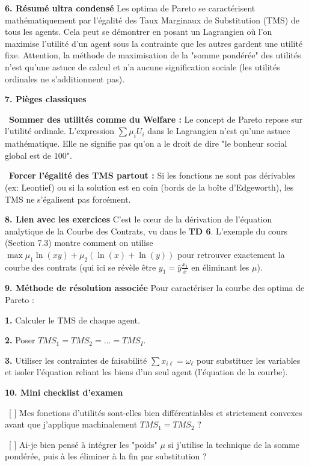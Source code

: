 \documentclass[11pt, a4paper]{report}
\begin{document}
\textbf{6. Résumé ultra condensé}
Les optima de Pareto se caractérisent mathématiquement par l'égalité des Taux Marginaux de Substitution (TMS) de tous les agents. Cela peut se démontrer en posant un Lagrangien où l'on maximise l'utilité d'un agent sous la contrainte que les autres gardent une utilité fixe. Attention, la méthode de maximisation de la "somme pondérée" des utilités n'est qu'une astuce de calcul et n'a aucune signification sociale (les utilités ordinales ne s'additionnent pas).

\textbf{7. Pièges classiques}
\par \textbullet\ \textbf{Sommer des utilités comme du Welfare :} Le concept de Pareto repose sur l'utilité ordinale. L'expression $\sum \mu_i U_i$ dans le Lagrangien n'est qu'une astuce mathématique. Elle ne signifie pas qu'on a le droit de dire "le bonheur social global est de 100".
\par \textbullet\ \textbf{Forcer l'égalité des TMS partout :} Si les fonctions ne sont pas dérivables (ex: Leontief) ou si la solution est en coin (bords de la boîte d'Edgeworth), les TMS ne s'égalisent pas forcément.

\textbf{8. Lien avec les exercices}
C'est le cœur de la dérivation de l'équation analytique de la Courbe des Contrats, vu dans le \textbf{TD 6}. L'exemple du cours (Section 7.3) montre comment on utilise $\max \mu_1 \ln(xy) + \mu_2(\ln(x)+\ln(y))$ pour retrouver exactement la courbe des contrats (qui ici se révèle être $y_1 = \bar{y} \frac{x_1}{\bar{x}}$ en éliminant les $\mu$).

\textbf{9. Méthode de résolution associée}
Pour caractériser la courbe des optima de Pareto :
\par \textbf{1.} Calculer le TMS de chaque agent.
\par \textbf{2.} Poser $TMS_1 = TMS_2 = ... = TMS_I$.
\par \textbf{3.} Utiliser les contraintes de faisabilité $\sum x_{i\ell} = \omega_\ell$ pour substituer les variables et isoler l'équation reliant les biens d'un seul agent (l'équation de la courbe).

\textbf{10. Mini checklist d’examen}
\par \textbullet\ [ ] Mes fonctions d'utilités sont-elles bien différentiables et strictement convexes avant que j'applique machinalement $TMS_1 = TMS_2$ ?
\par \textbullet\ [ ] Ai-je bien pensé à intégrer les "poids" $\mu$ si j'utilise la technique de la somme pondérée, puis à les éliminer à la fin par substitution ?
\end{document}
